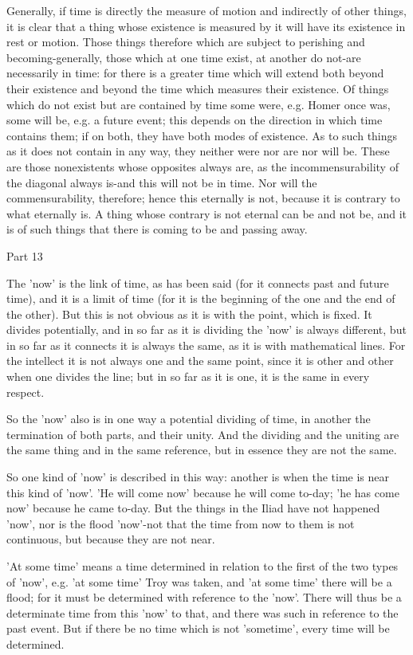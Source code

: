 Generally, if time is directly the measure of motion and indirectly
of other things, it is clear that a thing whose existence is measured
by it will have its existence in rest or motion. Those things therefore
which are subject to perishing and becoming-generally, those which
at one time exist, at another do not-are necessarily in time: for
there is a greater time which will extend both beyond their existence
and beyond the time which measures their existence. Of things which
do not exist but are contained by time some were, e.g. Homer once
was, some will be, e.g. a future event; this depends on the direction
in which time contains them; if on both, they have both modes of existence.
As to such things as it does not contain in any way, they neither
were nor are nor will be. These are those nonexistents whose opposites
always are, as the incommensurability of the diagonal always is-and
this will not be in time. Nor will the commensurability, therefore;
hence this eternally is not, because it is contrary to what eternally
is. A thing whose contrary is not eternal can be and not be, and it
is of such things that there is coming to be and passing away.

Part 13

The 'now' is the link of time, as has been said (for it connects past
and future time), and it is a limit of time (for it is the beginning
of the one and the end of the other). But this is not obvious as it
is with the point, which is fixed. It divides potentially, and in
so far as it is dividing the 'now' is always different, but in so
far as it connects it is always the same, as it is with mathematical
lines. For the intellect it is not always one and the same point,
since it is other and other when one divides the line; but in so far
as it is one, it is the same in every respect. 

So the 'now' also is in one way a potential dividing of time, in another
the termination of both parts, and their unity. And the dividing and
the uniting are the same thing and in the same reference, but in essence
they are not the same. 

So one kind of 'now' is described in this way: another is when the
time is near this kind of 'now'. 'He will come now' because he will
come to-day; 'he has come now' because he came to-day. But the things
in the Iliad have not happened 'now', nor is the flood 'now'-not that
the time from now to them is not continuous, but because they are
not near. 

'At some time' means a time determined in relation to the first of
the two types of 'now', e.g. 'at some time' Troy was taken, and 'at
some time' there will be a flood; for it must be determined with reference
to the 'now'. There will thus be a determinate time from this 'now'
to that, and there was such in reference to the past event. But if
there be no time which is not 'sometime', every time will be determined.

